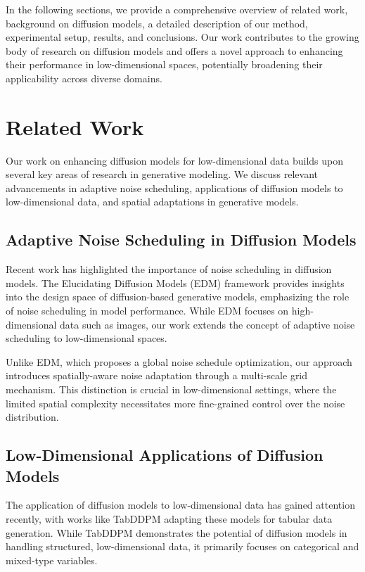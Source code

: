 \documentclass{article} %
\begin{document}
In the following sections, we provide a comprehensive overview of related work, background on diffusion models, a detailed description of our method, experimental setup, results, and conclusions. Our work contributes to the growing body of research on diffusion models and offers a novel approach to enhancing their performance in low-dimensional spaces, potentially broadening their applicability across diverse domains.

\section{Related Work}
\label{sec:related}

Our work on enhancing diffusion models for low-dimensional data builds upon several key areas of research in generative modeling. We discuss relevant advancements in adaptive noise scheduling, applications of diffusion models to low-dimensional data, and spatial adaptations in generative models.

\subsection{Adaptive Noise Scheduling in Diffusion Models}

Recent work has highlighted the importance of noise scheduling in diffusion models. The Elucidating Diffusion Models (EDM) framework \cite{edm} provides insights into the design space of diffusion-based generative models, emphasizing the role of noise scheduling in model performance. While EDM focuses on high-dimensional data such as images, our work extends the concept of adaptive noise scheduling to low-dimensional spaces.

Unlike EDM, which proposes a global noise schedule optimization, our approach introduces spatially-aware noise adaptation through a multi-scale grid mechanism. This distinction is crucial in low-dimensional settings, where the limited spatial complexity necessitates more fine-grained control over the noise distribution.

\subsection{Low-Dimensional Applications of Diffusion Models}

The application of diffusion models to low-dimensional data has gained attention recently, with works like TabDDPM \cite{kotelnikov2022tabddpm} adapting these models for tabular data generation. While TabDDPM demonstrates the potential of diffusion models in handling structured, low-dimensional data, it primarily focuses on categorical and mixed-type variables.
\end{document}
